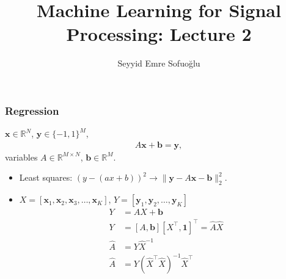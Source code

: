 \documentclass[a4,xcolor=dvipsnames]{beamer}
\title{Machine Learning for Signal Processing: Lecture 2}
\author{Seyyid Emre Sofuo\u{g}lu}
\def\R{\mathbb{R}}
\def\b{\mathbf{b}}
\def\x{\mathbf{x}}
\def\y{\mathbf{y}}
\begin{document}
\setlength{\leftmargini}{0.2cm}

\begin{frame}
    \maketitle
\end{frame}
\begin{frame}
    \frametitle{Regression}
    $\mathbf{x} \in \mathbb{R}^N$, $\y\in \{-1,1\}^M$,
    \begin{gather*}
        A\mathbf{x}+\mathbf{b} = \mathbf{y},
    \end{gather*}
    variables $A\in\mathbb{R}^{M\times N}$, $\b\in\R^{M}$.
    \begin{itemize}
        \item Least squares: $(y-(ax+b))^2 \rightarrow \|\y-A\x-\b\|_2^2$.
        \item $X = [\x_1, \x_2, \x_3,\dots, \x_K]$, $Y = [\y_1, \y_2, \dots, \y_K]$ 
        \begin{align*}
            Y &= AX + \b \\
            Y &= [A, \b] [X^\top, \mathbf{1}]^\top = \hat{A} \hat{X} \\
            \hat{A} & = Y \hat{X}^{-1} \\
            \hat{A} &= Y(\hat{X}^\top\hat{X})^{-1}\hat{X}^\top 
        \end{align*}
    \end{itemize}
\end{frame}
\end{document}
